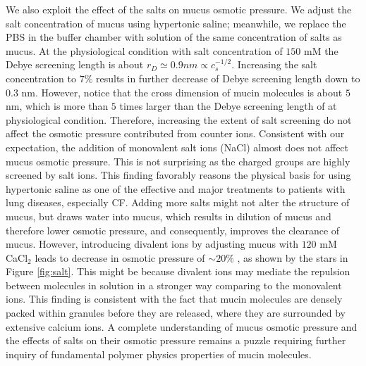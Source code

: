 \documentclass[8.5pt,twoside,twocolumn]{article}
\begin{document}
We also exploit the effect of the salts on mucus osmotic pressure. We adjust
the salt concentration of mucus using hypertonic saline; meanwhile, we
replace the PBS in the buffer chamber with solution of the same
concentration of salts as mucus. At the physiological condition with salt
concentration of $150$ mM the Debye screening length is about $r_{D}\simeq
0.9\unit{nm}\propto c_{s}^{-1/2}$\cite{Dobrynin2005}. Increasing the salt
concentration to $7\%$ results in further decrease of Debye screening length
down to $0.3$ nm. However, notice that the cross dimension of mucin
molecules is about $5$ nm\cite{Jentoft1990}, which is more than $5$ times
larger than the Debye screening length of at physiological condition.
Therefore, increasing the extent of salt screening do not affect the osmotic
pressure contributed from counter ions. Consistent with our expectation, the
addition of monovalent salt ions (NaCl) almost does not affect mucus osmotic
pressure. This is not surprising as the charged groups are highly screened
by salt ions. This finding favorably reasons the physical basis for using
hypertonic saline as one of the effective and major treatments to patients
with lung diseases, especially CF. Adding more salts might not alter the
structure of mucus, but draws water into mucus, which results in dilution of
mucus and therefore lower osmotic pressure, and consequently, improves the
clearance of mucus. However, introducing divalent ions by adjusting mucus
with $120$ mM CaCl$_{2}$ leads to decrease in osmotic pressure of $\sim 20\%$%
, as shown by the stars in Figure \ref{fig:salt}. This might be because
divalent ions may mediate the repulsion between molecules in solution in a
stronger way comparing to the monovalent ions. This finding is consistent
with the fact that mucin molecules are densely packed within granules before
they are released, where they are surrounded by extensive calcium ions\cite%
{Kesimer2010}. A complete understanding of mucus osmotic pressure and the
effects of salts on their osmotic pressure remains a puzzle requiring
further inquiry of fundamental polymer physics properties of mucin molecules.
\end{document}
